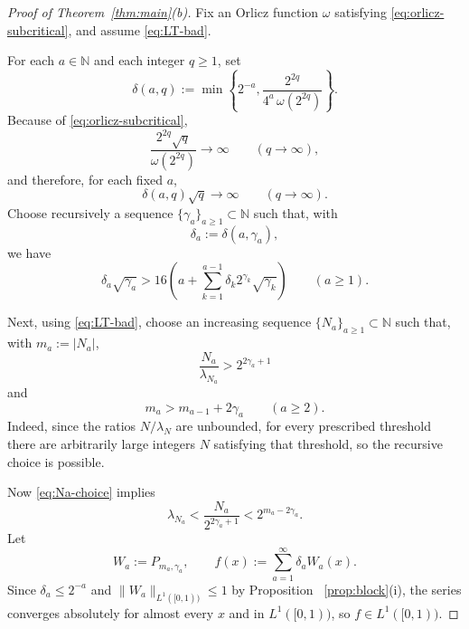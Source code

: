 \documentclass[11pt]{amsart}
\numberwithin{equation}{section}
\theoremstyle{plain}
\begin{document}
\begin{proof}[Proof of Theorem~\protect\ref{thm:main}(b)]
Fix an Orlicz function $\omega$ satisfying \eqref{eq:orlicz-subcritical},
and assume \eqref{eq:LT-bad}.

For each $a\in\mathbb{N}$ and each integer $q\ge1$, set 
\begin{equation*}
\delta(a,q):=\min\left\{2^{-a},\frac{2^{2q}}{4^a\,\omega(2^{2q})}\right\}.
\end{equation*}
Because of \eqref{eq:orlicz-subcritical}, 
\begin{equation*}
\frac{2^{2q}\sqrt{q}}{\omega(2^{2q})}\longrightarrow \infty \qquad
(q\to\infty),
\end{equation*}
and therefore, for each fixed $a$, 
\begin{equation*}
\delta(a,q)\sqrt{q}\longrightarrow \infty \qquad (q\to\infty).
\end{equation*}
Choose recursively a sequence $\{\gamma_a\}_{a\ge1}\subset\mathbb{N}$ such
that, with 
\begin{equation*}
\delta_a:=\delta(a,\gamma_a),
\end{equation*}
we have 
\begin{equation}  \label{eq:gamma-choice}
\delta_a\sqrt{\gamma_a}>16\left(a+\sum_{k=1}^{a-1} \delta_k 2^{\gamma_k}%
\sqrt{\gamma_k}\right) \qquad (a\ge1).
\end{equation}

Next, using \eqref{eq:LT-bad}, choose an increasing sequence $%
\{N_a\}_{a\ge1}\subset\mathbb{N}$ such that, with $m_a:=|N_a|$, 
\begin{equation}  \label{eq:Na-choice}
\frac{N_a}{\lambda_{N_a}}>2^{2\gamma_a+1}
\end{equation}
and 
\begin{equation}  \label{eq:ma-separation}
m_a>m_{a-1}+2\gamma_a \qquad (a\ge2).
\end{equation}
Indeed, since the ratios $N/\lambda_N$ are unbounded, for every prescribed
threshold there are arbitrarily large integers $N$ satisfying that
threshold, so the recursive choice is possible.

Now \eqref{eq:Na-choice} implies 
\begin{equation}  \label{eq:lambda-small}
\lambda_{N_a}<\frac{N_a}{2^{2\gamma_a+1}}<2^{m_a-2\gamma_a}.
\end{equation}
Let 
\begin{equation*}
W_a:=P_{m_a,\gamma_a}, \qquad f(x):=\sum_{a=1}^{\infty} \delta_a W_a(x).
\end{equation*}
Since $\delta_a\le 2^{-a}$ and $\|W_a\|_{L^{1}([0,1))}\le1$ by Proposition~%
\ref{prop:block}(i), the series converges absolutely for almost every $x$
and in $L^{1}([0,1))$, so $f\in L^{1}([0,1))$.


\end{proof}
\end{document}
